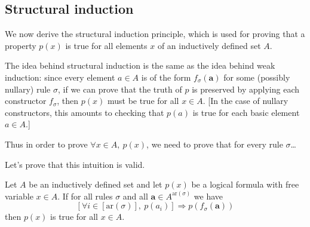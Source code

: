 \subsection*{Structural induction}

We now derive the structural induction principle, which is used for proving that a property $p(x)$ is true for all elements $x$ of an inductively defined set $A$.

The idea behind structural induction is the same as the idea behind weak induction: since every element $a \in A$ is of the form $f_{\sigma}(\mathbf{a})$ for some (possibly nullary) rule $\sigma$, if we can prove that the truth of $p$ is preserved by applying each constructor $f_{\sigma}$, then $p(x)$ must be true for all $x \in A$. [In the case of nullary constructors, this amounts to checking that $p(a)$ is true for each basic element $a \in A$.]

Thus in order to prove $\forall x \in A,~ p(x)$, we need to prove that for every rule $\sigma$\dots{}

\begin{center}
\end{center}

Let's prove that this intuition is valid.

\begin{theorem}
\label{thmStructuralInduction}
Let $A$ be an inductively defined set and let $p(x)$ be a logical formula with free variable $x \in A$. If for all rules $\sigma$ and all $\mathbf{a} \in A^{\mathrm{ar}(\sigma)}$ we have
\[ [\forall i \in [\mathrm{ar}(\sigma)],~ p(a_i)] \Rightarrow p(f_{\sigma}(\mathbf{a})) \]
then $p(x)$ is true for all $x \in A$.
\end{theorem}

